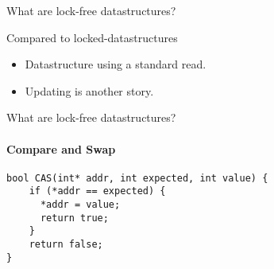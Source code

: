 \begin{frame}{What are lock-free datastructures?}
	\begin{block}{Compared to locked-datastructures}
		\begin{itemize}
			\item Datastructure using a standard \textcolor{ReneOrange}{read}.
			\item \textcolor{ReneOrange}{Updating} is another story.
		\end{itemize}
	\end{block}
\end{frame}

\begin{frame}{What are lock-free datastructures?}
\framesubtitle{Compare and Swap}
	\begin{lstlisting}
bool CAS(int* addr, int expected, int value) {
	if (*addr == expected) {
	  *addr = value;
	  return true;
	}
	return false;
} 
	\end{lstlisting}
\end{frame}